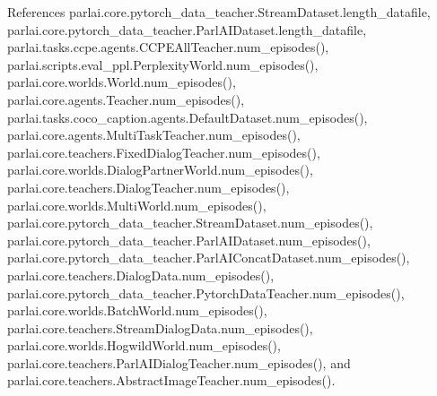 References parlai.\+core.\+pytorch\+\_\+data\+\_\+teacher.\+Stream\+Dataset.\+length\+\_\+datafile, parlai.\+core.\+pytorch\+\_\+data\+\_\+teacher.\+Parl\+A\+I\+Dataset.\+length\+\_\+datafile, parlai.\+tasks.\+ccpe.\+agents.\+C\+C\+P\+E\+All\+Teacher.\+num\+\_\+episodes(), parlai.\+scripts.\+eval\+\_\+ppl.\+Perplexity\+World.\+num\+\_\+episodes(), parlai.\+core.\+worlds.\+World.\+num\+\_\+episodes(), parlai.\+core.\+agents.\+Teacher.\+num\+\_\+episodes(), parlai.\+tasks.\+coco\+\_\+caption.\+agents.\+Default\+Dataset.\+num\+\_\+episodes(), parlai.\+core.\+agents.\+Multi\+Task\+Teacher.\+num\+\_\+episodes(), parlai.\+core.\+teachers.\+Fixed\+Dialog\+Teacher.\+num\+\_\+episodes(), parlai.\+core.\+worlds.\+Dialog\+Partner\+World.\+num\+\_\+episodes(), parlai.\+core.\+teachers.\+Dialog\+Teacher.\+num\+\_\+episodes(), parlai.\+core.\+worlds.\+Multi\+World.\+num\+\_\+episodes(), parlai.\+core.\+pytorch\+\_\+data\+\_\+teacher.\+Stream\+Dataset.\+num\+\_\+episodes(), parlai.\+core.\+pytorch\+\_\+data\+\_\+teacher.\+Parl\+A\+I\+Dataset.\+num\+\_\+episodes(), parlai.\+core.\+pytorch\+\_\+data\+\_\+teacher.\+Parl\+A\+I\+Concat\+Dataset.\+num\+\_\+episodes(), parlai.\+core.\+teachers.\+Dialog\+Data.\+num\+\_\+episodes(), parlai.\+core.\+pytorch\+\_\+data\+\_\+teacher.\+Pytorch\+Data\+Teacher.\+num\+\_\+episodes(), parlai.\+core.\+worlds.\+Batch\+World.\+num\+\_\+episodes(), parlai.\+core.\+teachers.\+Stream\+Dialog\+Data.\+num\+\_\+episodes(), parlai.\+core.\+worlds.\+Hogwild\+World.\+num\+\_\+episodes(), parlai.\+core.\+teachers.\+Parl\+A\+I\+Dialog\+Teacher.\+num\+\_\+episodes(), and parlai.\+core.\+teachers.\+Abstract\+Image\+Teacher.\+num\+\_\+episodes().

